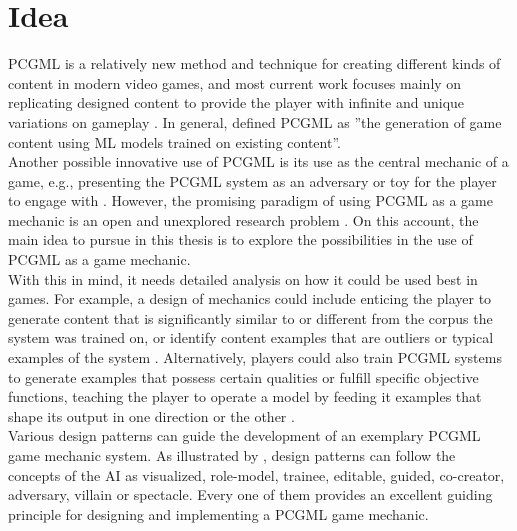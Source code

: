 \documentclass[MGS,Master,english]{twbook}%
\begin{document}
\section{Idea}
\ac{PCGML} is a relatively new method and technique for creating different kinds of content in modern video games, and most current work focuses mainly on replicating designed content to provide the player with infinite and unique variations on gameplay \cite{pcgml::paper}. In general, \cite{pcgml::paper} defined PCGML as ''the generation of game content using ML models trained on existing content''. \\
Another possible innovative use of PCGML is its use as the central mechanic of a game, e.g., presenting the PCGML system as an adversary or toy for the player to engage with  \cite{pcgml::paper}. However, the promising paradigm of using PCGML as a game mechanic is an open and unexplored research problem \cite{pcgml::paper}. On this account, the main idea to pursue in this thesis is to explore the possibilities in the use of PCGML as a game mechanic. \\
With this in mind, it needs detailed analysis on how it could be used best in games. For example, a design of mechanics could include enticing the player to generate content that is significantly similar to or different from the corpus the system was trained on, or identify content examples that are outliers or typical examples of the system \cite{pcgml::paper}. Alternatively, players could also train \ac{PCGML} systems to generate examples that possess certain qualities or fulfill specific objective functions, teaching the player to operate a model by feeding it examples that shape its output in one direction or the other \cite{pcgml::paper}. \\ 
Various design patterns can guide the development of an exemplary PCGML game mechanic system. As illustrated by \cite{ai::aiBasedGameDesignPattern}, design patterns can follow the concepts of the \ac{AI} as visualized, role-model, trainee, editable, guided, co-creator, adversary, villain or spectacle. Every one of them provides an excellent guiding principle for designing and implementing a PCGML game mechanic.
\end{document}
